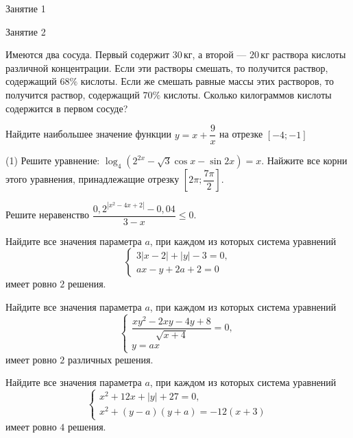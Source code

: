 %
%

\begin{class}[number=1]
	\begin{listofex}
		\item Занятие 1
	\end{listofex}
\end{class}

\begin{class}[number=2]
	\begin{listofex}
		\item Занятие 2
	\end{listofex}
\end{class}

\begin{homework}[number=1]
	\begin{listofex}
		\item Имеются два сосуда. Первый содержит \( 30 \) кг, а второй --- \( 20 \) кг раствора кислоты различной концентрации. Если эти растворы смешать, то получится раствор, содержащий \( 68\% \) кислоты. Если же смешать равные массы этих растворов, то получится раствор, содержащий \( 70\% \) кислоты. Сколько килограммов кислоты содержится в первом сосуде?
		\item Найдите наибольшее значение функции \( y=x+\dfrac{9}{x} \) на отрезке \( [-4; -1] \)
		\item 
		\begin{tasks}(1)
			\task Решите уравнение: \( \log_4\left( 2^{2x}-\sqrt{3}\cos x-\sin2x \right)=x \).
			\task Найжите все корни этого уравнения, принадлежащие отрезку \( \left[ 2\pi; \dfrac{7\pi}{2} \right]  \).
		\end{tasks}
		\item Решите неравенство \( \dfrac{0,2^{|x^2-4x+2|}-0,04}{3-x}\le0 \).
		\item Найдите все значения параметра \( a \), при каждом из которых система уравнений
		\[ \begin{cases}
			3|x-2|+|y|-3=0,\\
			ax-y+2a+2=0
		\end{cases} \]
		имеет ровно \( 2 \) решения.
		\item Найдите все значения параметра \( a \), при каждом из которых система уравнений
		\[ \begin{cases}
			\dfrac{xy^2-2xy-4y+8}{\sqrt{x+4}}=0,\\
			y=ax
		\end{cases} \]
		имеет ровно \( 2 \) различных решения.
		\item Найдите все значения параметра \( a \), при каждом из которых система уравнений
		\[ \begin{cases}
			x^2+12x+|y|+27=0,\\
			x^2+(y-a)(y+a)=-12(x+3)
		\end{cases} \]
		имеет ровно \( 4 \) решения.
	\end{listofex}
\end{homework}

